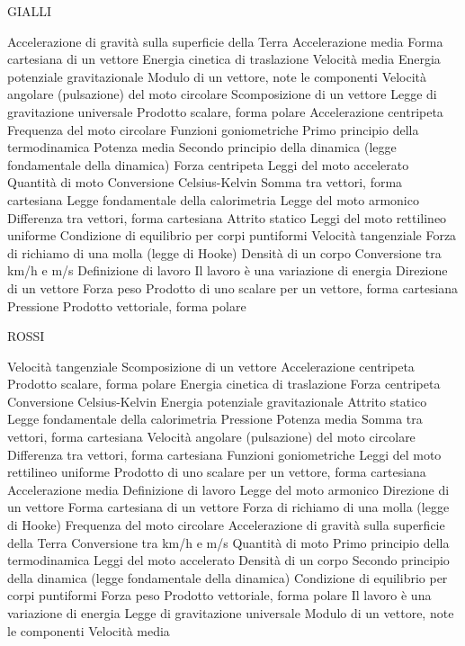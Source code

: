\documentclass[a4paper,11pt,italian]{article}
\begin{document}

GIALLI
\begin{enumerate}
{Accelerazione di gravità sulla superficie della Terra}
{Accelerazione media}
{Forma cartesiana di un vettore}
{Energia cinetica di traslazione}
{Velocità media}
{Energia potenziale gravitazionale}
{Modulo di un vettore, note le componenti}
{Velocità angolare (pulsazione) del moto circolare}
{Scomposizione di un vettore}
{Legge di gravitazione universale}
{Prodotto scalare, forma polare}
{Accelerazione centripeta}
{Frequenza del moto circolare}
{Funzioni goniometriche}
{Primo principio della termodinamica}
{Potenza media}
{Secondo principio della dinamica (legge fondamentale della dinamica)}
{Forza centripeta}
{Leggi del moto accelerato}
{Quantità di moto}
{Conversione Celsius-Kelvin}
{Somma tra vettori, forma cartesiana}
{Legge fondamentale della calorimetria}
{Legge del moto armonico}
{Differenza tra vettori, forma cartesiana}
{Attrito statico}
{Leggi del moto rettilineo uniforme}
{Condizione di equilibrio per corpi puntiformi}
{Velocità tangenziale}
{Forza di richiamo di una molla (legge di Hooke)}
{Densità di un corpo}
{Conversione tra km/h e m/s}
{Definizione di lavoro}
{Il lavoro è una variazione di energia}
{Direzione di un vettore}
{Forza peso}
{Prodotto di uno scalare per un vettore, forma cartesiana}
{Pressione}
{Prodotto vettoriale, forma polare}
\end{enumerate}



ROSSI
\begin{enumerate}
{Velocità tangenziale}
{Scomposizione di un vettore}
{Accelerazione centripeta}
{Prodotto scalare, forma polare}
{Energia cinetica di traslazione}
{Forza centripeta}
{Conversione Celsius-Kelvin}
{Energia potenziale gravitazionale}
{Attrito statico}
{Legge fondamentale della calorimetria}
{Pressione}
{Potenza media}
{Somma tra vettori, forma cartesiana}
{Velocità angolare (pulsazione) del moto circolare}
{Differenza tra vettori, forma cartesiana}
{Funzioni goniometriche}
{Leggi del moto rettilineo uniforme}
{Prodotto di uno scalare per un vettore, forma cartesiana}
{Accelerazione media}
{Definizione di lavoro}
{Legge del moto armonico}
{Direzione di un vettore}
{Forma cartesiana di un vettore}
{Forza di richiamo di una molla (legge di Hooke)}
{Frequenza del moto circolare}
{Accelerazione di gravità sulla superficie della Terra}
{Conversione tra km/h e m/s}
{Quantità di moto}
{Primo principio della termodinamica}
{Leggi del moto accelerato}
{Densità di un corpo}
{Secondo principio della dinamica (legge fondamentale della dinamica)}
{Condizione di equilibrio per corpi puntiformi}
{Forza peso}
{Prodotto vettoriale, forma polare}
{Il lavoro è una variazione di energia}
{Legge di gravitazione universale}
{Modulo di un vettore, note le componenti}
{Velocità media}
\end{enumerate}
\end{document}
